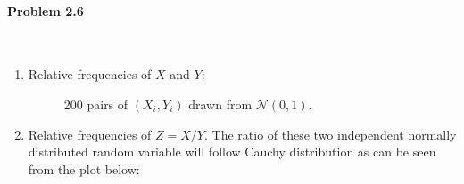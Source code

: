 \documentclass[12pt, letterpaper]{scrartcl}
\begin{document}
\paragraph*{Problem 2.6} \hfill\\
    \begin{enumerate}[((a))]
        \item Relative frequencies of $X$ and $Y$: 
        \begin{figure}[h!]
            \centering
            \hfill
            \vfill
            \caption{200 pairs of $(X_i, Y_i)$ drawn from $\mathcal{N}(0, 1)$.}
        \end{figure}
        \clearpage
        \item Relative frequencies of $Z=X/Y$. The ratio of these two independent normally distributed random variable will follow Cauchy distribution as can be seen from the plot below:

\end{enumerate}
\end{document}
